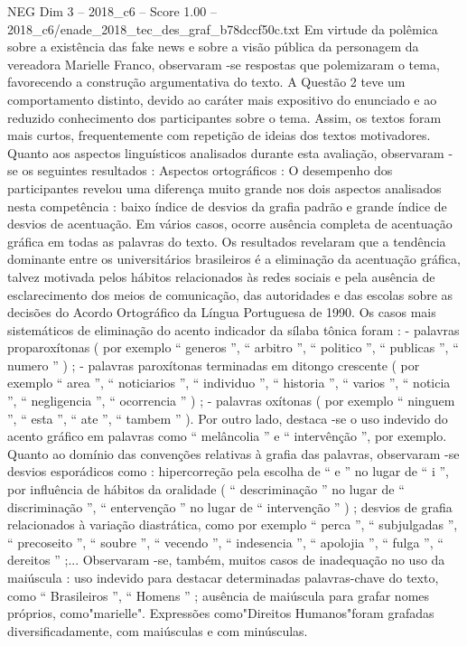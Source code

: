 \begin{textsample}{NEG Dim 3 – 2018\_c6 – Score 1.00 – 2018\_c6/enade\_2018\_tec\_des\_graf\_b78dccf50c.txt}
Em virtude da polêmica sobre a existência das fake news e sobre a visão pública da personagem da vereadora Marielle Franco, observaram -se respostas que polemizaram o tema, favorecendo a construção argumentativa do texto.
A Questão 2 teve um comportamento distinto, devido ao caráter mais expositivo do enunciado e ao reduzido conhecimento dos participantes sobre o tema.
Assim, os textos foram mais curtos, frequentemente com repetição de ideias dos textos motivadores.
Quanto aos aspectos linguísticos analisados durante esta avaliação, observaram -se os seguintes resultados : Aspectos ortográficos : O desempenho dos participantes revelou uma diferença muito grande nos dois aspectos analisados nesta competência : baixo índice de desvios da grafia padrão e grande índice de desvios de acentuação.
Em vários casos, ocorre ausência completa de acentuação gráfica em todas as palavras do texto.
Os resultados revelaram que a tendência dominante entre os universitários brasileiros é a eliminação da acentuação gráfica, talvez motivada pelos hábitos relacionados às redes sociais e pela ausência de esclarecimento dos meios de comunicação, das autoridades e das escolas sobre as decisões do Acordo Ortográfico da Língua Portuguesa de 1990.
Os casos mais sistemáticos de eliminação do acento indicador da sílaba tônica foram : - palavras proparoxítonas ( por exemplo “ generos ”, “ arbitro ”, “ politico ”, “ publicas ”, “ numero ” ) ; - palavras paroxítonas terminadas em ditongo crescente ( por exemplo “ area ”, “ noticiarios ”, “ individuo ”, “ historia ”, “ varios ”, “ noticia ”, “ negligencia ”, “ ocorrencia ” ) ; - palavras oxítonas ( por exemplo “ ninguem ”, “ esta ”, “ ate ”, “ tambem ” ).
Por outro lado, destaca -se o uso indevido do acento gráfico em palavras como “ melâncolia ” e “ intervênção ”, por exemplo.
Quanto ao domínio das convenções relativas à grafia das palavras, observaram -se desvios esporádicos como : hipercorreção pela escolha de “ e ” no lugar de “ i ”, por influência de hábitos da oralidade ( “ descriminação ” no lugar de “ discriminação ”, “ entervenção ” no lugar de “ intervenção ” ) ; desvios de grafia relacionados à variação diastrática, como por exemplo “ perca ”, “ subjulgadas ”, “ precoseito ”, “ soubre ”, “ vecendo ”, “ indesencia ”, “ apolojia ”, “ fulga ”, “ dereitos ” ;...
Observaram -se, também, muitos casos de inadequação no uso da maiúscula : uso indevido para destacar determinadas palavras-chave do texto, como “ Brasileiros ”, “ Homens ” ; ausência de maiúscula para grafar nomes próprios, como"marielle".
Expressões como"Direitos Humanos"foram grafadas diversificadamente, com maiúsculas e com minúsculas.

\end{textsample}
